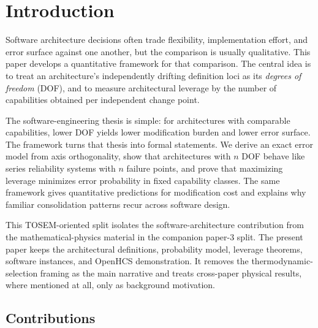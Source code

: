 \section{Introduction}\label{introduction}

Software architecture decisions often trade flexibility, implementation effort, and error surface against one another, but the comparison is usually qualitative. This paper develops a quantitative framework for that comparison. The central idea is to treat an architecture's independently drifting definition loci as its \emph{degrees of freedom} (DOF), and to measure architectural leverage by the number of capabilities obtained per independent change point.

The software-engineering thesis is simple: for architectures with comparable capabilities, lower DOF yields lower modification burden and lower error surface. The framework turns that thesis into formal statements. We derive an exact error model from axis orthogonality, show that architectures with $n$ DOF behave like series reliability systems with $n$ failure points, and prove that maximizing leverage minimizes error probability in fixed capability classes. The same framework gives quantitative predictions for modification cost and explains why familiar consolidation patterns recur across software design.

This TOSEM-oriented split isolates the software-architecture contribution from the mathematical-physics material in the companion paper-3 split. The present paper keeps the architectural definitions, probability model, leverage theorems, software instances, and OpenHCS demonstration. It removes the thermodynamic-selection framing as the main narrative and treats cross-paper physical results, where mentioned at all, only as background motivation.

\subsection{Contributions}

